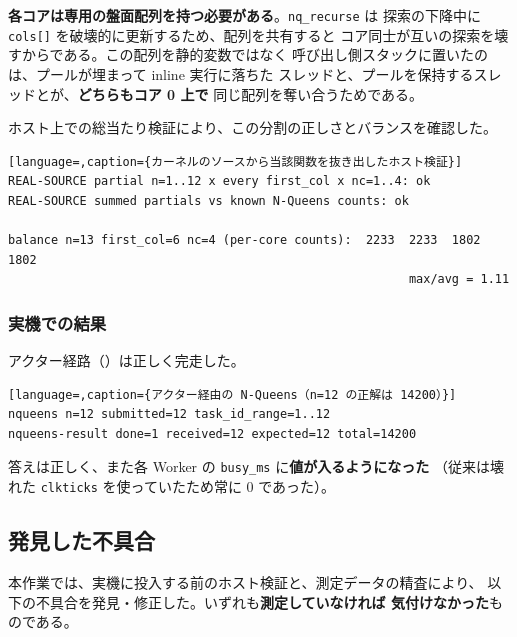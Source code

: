 \textbf{各コアは専用の盤面配列を持つ必要がある}。\texttt{nq\_recurse} は
探索の下降中に \texttt{cols[]} を破壊的に更新するため、配列を共有すると
コア同士が互いの探索を壊すからである。この配列を静的変数ではなく
呼び出し側スタックに置いたのは、プールが埋まって inline 実行に落ちた
スレッドと、プールを保持するスレッドとが、\textbf{どちらもコア 0 上で}
同じ配列を奪い合うためである。

ホスト上での総当たり検証により、この分割の正しさとバランスを確認した。

\begin{lstlisting}[language=,caption={カーネルのソースから当該関数を抜き出したホスト検証}]
REAL-SOURCE partial n=1..12 x every first_col x nc=1..4: ok
REAL-SOURCE summed partials vs known N-Queens counts: ok

balance n=13 first_col=6 nc=4 (per-core counts):  2233  2233  1802  1802
                                                        max/avg = 1.11
\end{lstlisting}

\subsubsection*{実機での結果}

アクター経路（）は正しく完走した。

\begin{lstlisting}[language=,caption={アクター経由の N-Queens（n=12 の正解は 14200）}]
nqueens n=12 submitted=12 task_id_range=1..12
nqueens-result done=1 received=12 expected=12 total=14200
\end{lstlisting}

\noindent
答えは正しく、また各 Worker の \texttt{busy\_ms} に\textbf{値が入るようになった}
（従来は壊れた \texttt{clkticks} を使っていたため常に 0 であった）。

\subsection{発見した不具合}
\label{sec:rpi3-bugs}

本作業では、実機に投入する前のホスト検証と、測定データの精査により、
以下の不具合を発見・修正した。いずれも\textbf{測定していなければ
気付けなかった}ものである。

